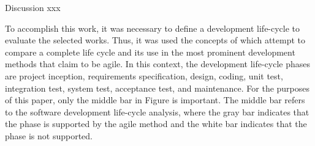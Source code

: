 Discussion xxx

To accomplish this work, it was necessary to define a development life-cycle to evaluate the selected works. Thus, it was used the concepts of \cite{papazoglou2006service} which attempt to compare a complete life cycle and its use in the most prominent development methods that claim to be agile. In this context, the development life-cycle phases are project inception, requirements specification, design, coding, unit test, integration test, system test, acceptance test, and maintenance. For the purposes of this paper, only the middle bar in Figure  is important. The middle bar refers to the software development life-cycle analysis, where the gray bar indicates that the phase is supported by the agile method and the white bar indicates that the phase is not supported.